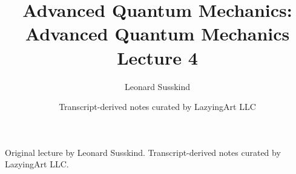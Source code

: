 \documentclass[11pt,oneside]{book}
\begin{document}
\frontmatter
\title{Advanced Quantum Mechanics: Advanced Quantum Mechanics Lecture 4}
\author{Leonard Susskind}
\date{Transcript-derived notes curated by LazyingArt LLC}
\maketitle
\begin{center}
\small Original lecture by Leonard Susskind. Transcript-derived notes curated by LazyingArt LLC.
\end{center}
\clearpage
\mainmatter

\end{document}
